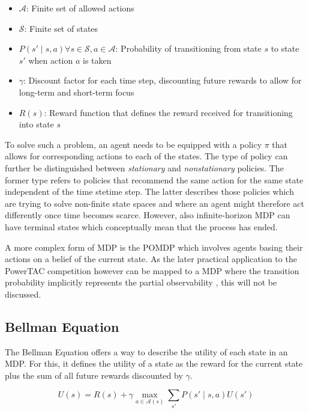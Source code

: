 \begin{itemize}
	\item $\mathcal{A}$: Finite set of allowed actions  
	\item $\mathcal{S}$: Finite set of states
	\item $P(s' \mid s,a) \forall s \in \mathcal{S}, a \in \mathcal{A}$: Probability of transitioning from state
	$s$ to state $s'$ when action $a$ is taken
	\item $\gamma$: Discount factor for each time step, discounting future rewards to allow for long-term and
		short-term focus
	\item $R(s)$: Reward function that defines the reward received for transitioning into state $s$
\end{itemize}

To solve such a problem, an agent needs to be equipped with a policy $\pi$ that allows for corresponding actions to each
of the states. The type of policy can further be distinguished between \emph{stationary} and \emph{nonstationary}
policies. The former type refers to policies that recommend the same action for the same state independent of the
time stetime step. The latter describes those policies which are trying to solve non-finite state spaces and where an
agent might therefore act differently once time becomes scarce. However, also infinite-horizon \ac {MDP} can have
terminal states which conceptually mean that the process has ended.

A more complex form of \ac {MDP} is the \ac {POMDP} which involves agents basing their actions on a belief of the
current state. As the later practical application to the \ac {PowerTAC} competition however can be mapped to a \ac {MDP}
where the transition probability implicitly represents the partial observability \citep{tactexurieli2016mdp}, this will not be discussed. 

\subsection{Bellman Equation}%
\label{ssub:bellman_equation}

The Bellman Equation offers a way to describe the utility of each state in an \ac {MDP}. For this, it defines the
utility of a state as the reward for the current state plus the sum of all future rewards discounted by $\gamma$. 

\begin{equation}
U(s) = R(s) + \gamma \max_{a\in\mathcal{A}(s)} \sum_{s'}{P(s' \mid s,a)U(s')}
\end{equation}

